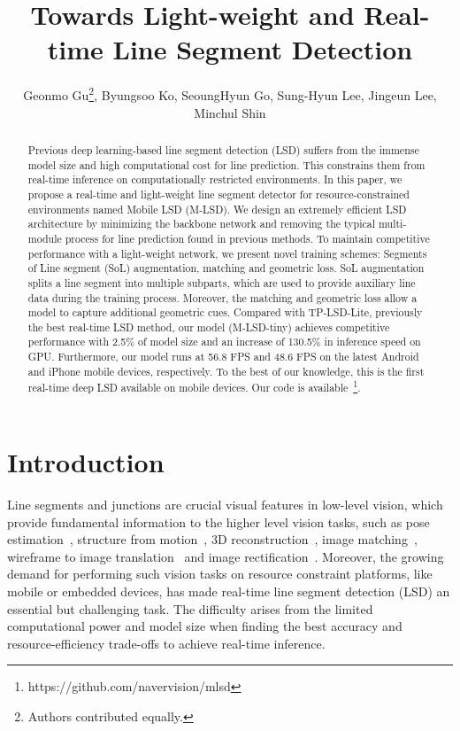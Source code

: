 \documentclass[letterpaper]{article} \usepackage{aaai22}  \usepackage{times}  \usepackage{helvet}  \usepackage{courier}  \usepackage[hyphens]{url}  \usepackage{graphicx} \urlstyle{rm} \def\UrlFont{\rm}  \usepackage{natbib}  \usepackage{caption} \DeclareCaptionStyle{ruled}{labelfont=normalfont,labelsep=colon,strut=off} \frenchspacing  \setlength{\pdfpagewidth}{8.5in}  \setlength{\pdfpageheight}{11in}  \usepackage{algorithm}
\title{Towards Light-weight and Real-time Line Segment Detection}
\author {


        Geonmo Gu\thanks{Authors contributed equally.},
        Byungsoo Ko\footnotemark[1],
        SeoungHyun Go,
        Sung-Hyun Lee,
        Jingeun Lee,
        Minchul Shin\\
}
\begin{document}
\maketitle

\begin{abstract}
Previous deep learning-based line segment detection (LSD) suffers from the immense model size and high computational cost for line prediction.
This constrains them from real-time inference on computationally restricted environments.
In this paper, we propose a real-time and light-weight line segment detector for resource-constrained environments named Mobile LSD (M-LSD).
We design an extremely efficient LSD architecture by minimizing the backbone network and removing the typical multi-module process for line prediction found in previous methods.
To maintain competitive performance with a light-weight network, we present novel training schemes: Segments of Line segment (SoL) augmentation, matching and geometric loss.
SoL augmentation splits a line segment into multiple subparts, which are used to provide auxiliary line data during the training process.
Moreover, the matching and geometric loss allow a model to capture additional geometric cues.
Compared with TP-LSD-Lite, previously the best real-time LSD method, our model (M-LSD-tiny) achieves competitive performance with 2.5\% of model size and an increase of 130.5\% in inference speed on GPU.
Furthermore, our model runs at 56.8 FPS and 48.6 FPS on the latest Android and iPhone mobile devices, respectively.
To the best of our knowledge, this is the first real-time deep LSD available on mobile devices.
Our code is available~\footnote{https://github.com/navervision/mlsd}.
\end{abstract}

\section{Introduction}

Line segments and junctions are crucial visual features in low-level vision, which provide fundamental information to the higher level vision tasks, such as pose estimation~\cite{pvribyl2017absolute,xu2016pose}, structure from motion~\cite{bartoli2005structure,micusik2017structure}, 3D reconstruction~\cite{denis2008efficient, faugeras1992depth}, image matching~\cite{xue2017anisotropic}, wireframe to image translation~\cite{xue2019neural} and image rectification~\cite{xue2019rectification}.
Moreover, the growing demand for performing such vision tasks on resource constraint platforms, like mobile or embedded devices, has made real-time line segment detection (LSD) an essential but challenging task. 
The difficulty arises from the limited computational power and model size when finding the best accuracy and resource-efficiency trade-offs to achieve real-time inference.
\end{document}
